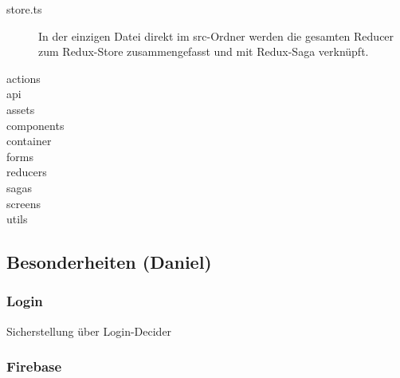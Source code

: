 \begin{description}
    \item[store.ts]
    In der einzigen Datei direkt im src-Ordner werden die gesamten Reducer zum Redux-Store zusammengefasst und mit
    Redux-Saga verknüpft.
    \item[actions]

    \item[api]
    \item[assets]
    \item[components]
    \item[container]
    \item[forms]
    \item[reducers]
    \item[sagas]
    \item[screens]
    \item[utils]
\end{description}




\subsection{Besonderheiten (Daniel)}
\subsubsection{Login}
Sicherstellung über Login-Decider

\subsubsection{Firebase}
